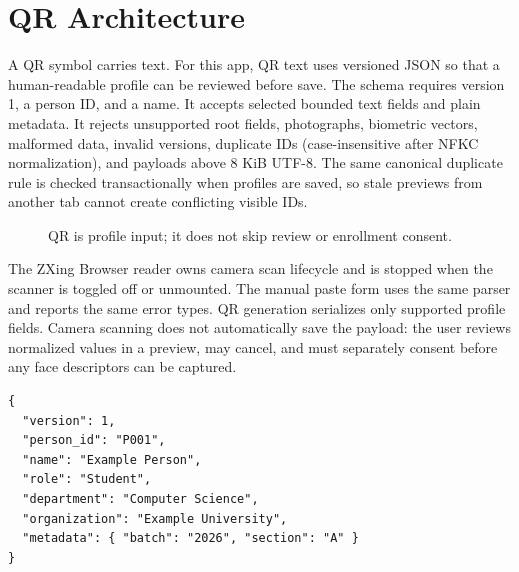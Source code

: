 \documentclass[11pt,oneside,openany]{report}
\begin{document}
\chapter{QR Architecture}
A QR symbol carries text. For this app, QR text uses versioned JSON so that a human-readable profile can be reviewed before save. The schema requires version 1, a person ID, and a name. It accepts selected bounded text fields and plain metadata. It rejects unsupported root fields, photographs, biometric vectors, malformed data, invalid versions, duplicate IDs (case-insensitive after NFKC normalization), and payloads above 8 KiB UTF-8. The same canonical duplicate rule is checked transactionally when profiles are saved, so stale previews from another tab cannot create conflicting visible IDs.

\begin{figure}[htbp]
\centering
{}
\caption{QR is profile input; it does not skip review or enrollment consent.}
\label{fig:qr-flow}
\end{figure}

The ZXing Browser reader owns camera scan lifecycle and is stopped when the scanner is toggled off or unmounted. The manual paste form uses the same parser and reports the same error types. QR generation serializes only supported profile fields. Camera scanning does not automatically save the payload: the user reviews normalized values in a preview, may cancel, and must separately consent before any face descriptors can be captured.

\begin{lstlisting}[caption={Illustrative v1 payload. This payload describes a profile only.}]
{
  "version": 1,
  "person_id": "P001",
  "name": "Example Person",
  "role": "Student",
  "department": "Computer Science",
  "organization": "Example University",
  "metadata": { "batch": "2026", "section": "A" }
}
\end{lstlisting}
\end{document}

